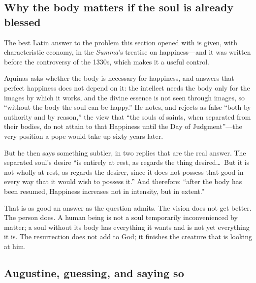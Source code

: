 \subsection{Why the body matters if the soul is already blessed}

The best Latin answer to the problem this section opened with is given, with characteristic economy, in the \emph{Summa}'s treatise on happiness---and it was written before the controversy of the 1330s, which makes it a useful control.

Aquinas asks whether the body is necessary for happiness, and answers that perfect happiness does not depend on it: the intellect needs the body only for the images by which it works, and the divine essence is not seen through images, so ``without the body the soul can be happy.'' He notes, and rejects as false ``both by authority and by reason,'' the view that ``the souls of saints, when separated from their bodies, do not attain to that Happiness until the Day of Judgment''---the very position a pope would take up sixty years later.

But he then says something subtler, in two replies that are the real answer. The separated soul's desire ``is entirely at rest, as regards the thing desired\ldots\ But it is not wholly at rest, as regards the desirer, since it does not possess that good in every way that it would wish to possess it.'' And therefore: ``after the body has been resumed, Happiness increases not in intensity, but in extent.''

That is as good an answer as the question admits. The vision does not get better. The person does. A human being is not a soul temporarily inconvenienced by matter; a soul without its body has everything it wants and is not yet everything it is. The resurrection does not add to God; it finishes the creature that is looking at him.

\subsection{Augustine, guessing, and saying so}

